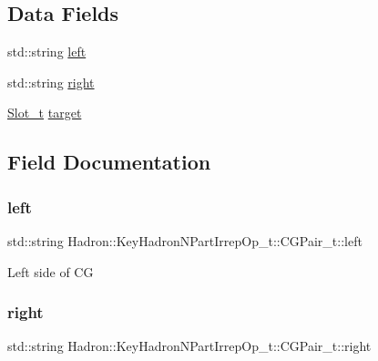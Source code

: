 \subsection*{Data Fields}
\begin{DoxyCompactItemize}
\item 
std\+::string \mbox{\hyperlink{structHadron_1_1KeyHadronNPartIrrepOp__t_1_1CGPair__t_a642ae7c9113d0485ffa8012832971adc}{left}}
\item 
std\+::string \mbox{\hyperlink{structHadron_1_1KeyHadronNPartIrrepOp__t_1_1CGPair__t_abf56ca1b56ab38aed08a2ae07cb65933}{right}}
\item 
\mbox{\hyperlink{structHadron_1_1KeyHadronNPartIrrepOp__t_1_1CGPair__t_1_1Slot__t}{Slot\+\_\+t}} \mbox{\hyperlink{structHadron_1_1KeyHadronNPartIrrepOp__t_1_1CGPair__t_aeb67dd901fec46892d25ddf2237eaa7d}{target}}
\end{DoxyCompactItemize}


\subsection{Field Documentation}
\mbox{\label{structHadron_1_1KeyHadronNPartIrrepOp__t_1_1CGPair__t_a642ae7c9113d0485ffa8012832971adc}} 
\subsubsection{\texorpdfstring{left}{left}}
{\footnotesize\ttfamily std\+::string Hadron\+::\+Key\+Hadron\+N\+Part\+Irrep\+Op\+\_\+t\+::\+C\+G\+Pair\+\_\+t\+::left}

Left side of CG \mbox{\label{structHadron_1_1KeyHadronNPartIrrepOp__t_1_1CGPair__t_abf56ca1b56ab38aed08a2ae07cb65933}} 
\subsubsection{\texorpdfstring{right}{right}}
{\footnotesize\ttfamily std\+::string Hadron\+::\+Key\+Hadron\+N\+Part\+Irrep\+Op\+\_\+t\+::\+C\+G\+Pair\+\_\+t\+::right}

